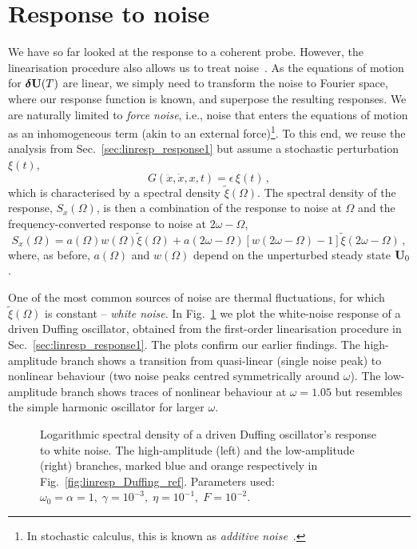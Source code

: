 \section{Response to noise} 

We have so far looked at the response to a coherent probe. However, the linearisation procedure also allows us to treat noise~\cite{Ochs_2021, Huber_2020}. As the equations of motion for $\boldsymbol{\delta} \vb{U}(T)$ are linear, we simply need to transform the noise to Fourier space, where our response function is known, and superpose the resulting responses. We are naturally limited to \textit{force noise}, i.e., noise that enters the equations of motion as an inhomogeneous term (akin to an external force)\footnote{In stochastic calculus, this is known as \textit{additive noise}~\cite{Gardiner}.}. To this end, we reuse the analysis from Sec.~\ref{sec:linresp_response1} but assume a stochastic perturbation $\xi(t)$,
\begin{equation}
G(\ddot{x}, \dot{x}, x, t) = \epsilon\, \xi(t)\,,
\end{equation}
which is characterised by a spectral density $\tilde{\xi}(\Omega)$. The spectral density of the response, $S_x(\Omega)$, is then a combination of the response to noise at $\Omega$ and the frequency-converted response to noise at $2\omega - \Omega$, 
\begin{equation} \label{eq:linresp_noise}
S_x(\Omega) = a(\Omega) w(\Omega)\tilde{\xi}(\Omega) + a(2\omega - \Omega) \left[w(2\omega - \Omega) - 1 \right] \tilde{\xi}(2\omega-\Omega)\,,
\end{equation}
where, as before, $a(\Omega)$ and $w(\Omega)$ depend on the unperturbed steady state $\vb{U}_0$.

One of the most common sources of noise are thermal fluctuations, for which $\tilde{\xi}(\Omega)$ is constant -- \textit{white noise}. In Fig.~\ref{fig:linresp_noise} we plot the white-noise response of a driven Duffing oscillator, obtained from the first-order linearisation procedure in Sec.~\ref{sec:linresp_response1}. The plots confirm our earlier findings. The high-amplitude branch shows a transition from quasi-linear (single noise peak) to nonlinear behaviour (two noise peaks centred symmetrically around $\omega$). The low-amplitude branch shows traces of nonlinear behaviour at $\omega=1.05$ but resembles the simple harmonic oscillator for larger $\omega$. 

%
\begin{figure} [h!]
	\centering
	
	\caption{Logarithmic spectral density of a driven Duffing oscillator's response to white noise. The high-amplitude (left) and the low-amplitude (right) branches, marked blue and orange respectively in Fig.~\ref{fig:linresp_Duffing_ref}. Parameters used: $\omega_0 = \alpha = 1, \; \gamma = 10^{-3} , \; \eta = 10^{-1},\; F = 10^{-2}$.}
	\label{fig:linresp_noise}
\end{figure}
%
